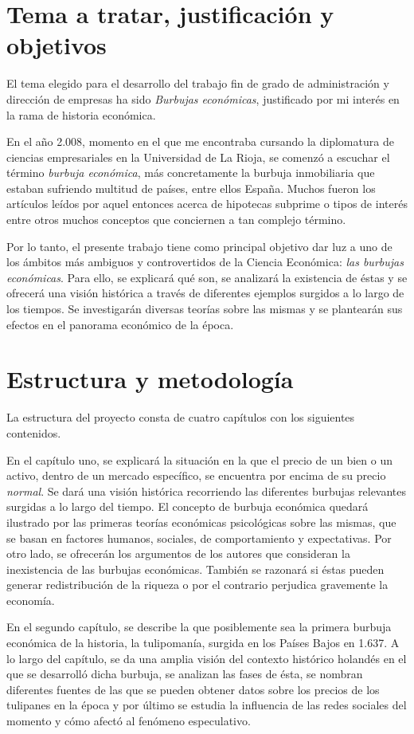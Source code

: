 \section{Tema a tratar, justificación y objetivos}
El tema elegido para el desarrollo del trabajo fin de grado de
administración y dirección de empresas ha sido \emph{Burbujas económicas},
justificado por mi interés en la rama de historia económica.

En el año 2.008, momento en el que me encontraba cursando la diplomatura
de ciencias empresariales en la Universidad de La Rioja, se comenzó a
escuchar el término \emph{burbuja económica}, más concretamente la burbuja
inmobiliaria que estaban sufriendo multitud de países, entre ellos
España. Muchos fueron los artículos leídos por aquel entonces acerca de
hipotecas subprime o tipos de interés entre otros muchos conceptos que
conciernen a tan complejo término. 

Por lo tanto, el presente trabajo tiene como principal objetivo dar luz
a uno de los ámbitos más ambiguos y controvertidos de la Ciencia
Económica: \emph{las burbujas económicas}. Para ello, se explicará qué son, se analizará la existencia de éstas y se ofrecerá una visión histórica a través de diferentes ejemplos surgidos a lo largo de los tiempos. Se investigarán diversas teorías sobre las mismas y se plantearán sus efectos en el panorama económico de la época. 

\section{Estructura y metodología}
La estructura del proyecto consta de cuatro capítulos con los siguientes
contenidos.

En el capítulo uno, se explicará la situación en la que el precio de un
bien o un activo, dentro de un mercado específico, se encuentra por
encima de su precio \emph{normal}. Se dará una visión histórica
recorriendo las diferentes burbujas relevantes surgidas a lo largo del
tiempo. El concepto de burbuja económica quedará ilustrado por las
primeras teorías económicas psicológicas sobre las mismas, que se basan
en factores humanos, sociales, de comportamiento y expectativas. Por
otro lado, se ofrecerán los argumentos de los autores que consideran la
inexistencia de las burbujas económicas. También se razonará si éstas
pueden generar redistribución de la riqueza o por el contrario
perjudica gravemente la economía. 

En el segundo capítulo, se describe la que posiblemente sea la primera
burbuja económica de la historia, la tulipomanía, surgida en los Países
Bajos en 1.637. A lo largo del capítulo, se da una amplia visión del
contexto histórico holandés en el que se desarrolló dicha burbuja, se
analizan las fases de ésta, se nombran diferentes fuentes de las que se
pueden obtener datos sobre los precios de los tulipanes en la época y
por último se estudia la influencia de las redes sociales del momento y
cómo afectó al fenómeno especulativo. 

